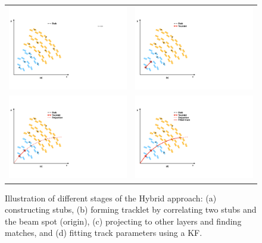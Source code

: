 \begin{figure}[tbh!]
 \begin{center}
  \begin{tabular}{cc}
   \includegraphics[width=.45\linewidth]{figures/Part2/Upgrade/tracklet1} &
   \includegraphics[width=.45\linewidth]{figures/Part2/Upgrade/tracklet2} \\
   \includegraphics[width=.45\linewidth]{figures/Part2/Upgrade/tracklet3} &
   \includegraphics[width=.45\linewidth]{figures/Part2/Upgrade/tracklet4} \\
  \end{tabular}
  \caption{Illustration of different stages of the Hybrid approach: (a) constructing stubs, (b) forming tracklet by correlating two stubs and the beam spot (origin), (c) projecting to other layers and finding matches, and (d) fitting track parameters using a \ac{KF}.}
 \label{fig:algorithm}
 \end{center}
\end{figure}

